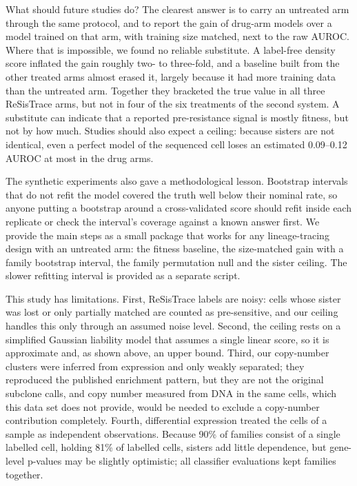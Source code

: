 \documentclass[11pt,a4paper]{article}
\begin{document}
What should future studies do? The clearest answer is to carry an untreated arm through the same protocol, and to report the gain of drug-arm models over a model trained on that arm, with training size matched, next to the raw AUROC. Where that is impossible, we found no reliable substitute. A label-free density score inflated the gain roughly two- to three-fold, and a baseline built from the other treated arms almost erased it, largely because it had more training data than the untreated arm. Together they bracketed the true value in all three ReSisTrace arms, but not in four of the six treatments of the second system. A substitute can indicate that a reported pre-resistance signal is mostly fitness, but not by how much. Studies should also expect a ceiling: because sisters are not identical, even a perfect model of the sequenced cell loses an estimated 0.09--0.12 AUROC at most in the drug arms.

The synthetic experiments also gave a methodological lesson. Bootstrap intervals that do not refit the model covered the truth well below their nominal rate, so anyone putting a bootstrap around a cross-validated score should refit inside each replicate or check the interval's coverage against a known answer first. We provide the main steps as a small package that works for any lineage-tracing design with an untreated arm: the fitness baseline, the size-matched gain with a family bootstrap interval, the family permutation null and the sister ceiling. The slower refitting interval is provided as a separate script.

This study has limitations. First, ReSisTrace labels are noisy: cells whose sister was lost or only partially matched are counted as pre-sensitive, and our ceiling handles this only through an assumed noise level. Second, the ceiling rests on a simplified Gaussian liability model that assumes a single linear score, so it is approximate and, as shown above, an upper bound. Third, our copy-number clusters were inferred from expression and only weakly separated; they reproduced the published enrichment pattern, but they are not the original subclone calls, and copy number measured from DNA in the same cells, which this data set does not provide, would be needed to exclude a copy-number contribution completely. Fourth, differential expression treated the cells of a sample as independent observations. Because 90\% of families consist of a single labelled cell, holding 81\% of labelled cells, sisters add little dependence, but gene-level p-values may be slightly optimistic; all classifier evaluations kept families together.
\end{document}
